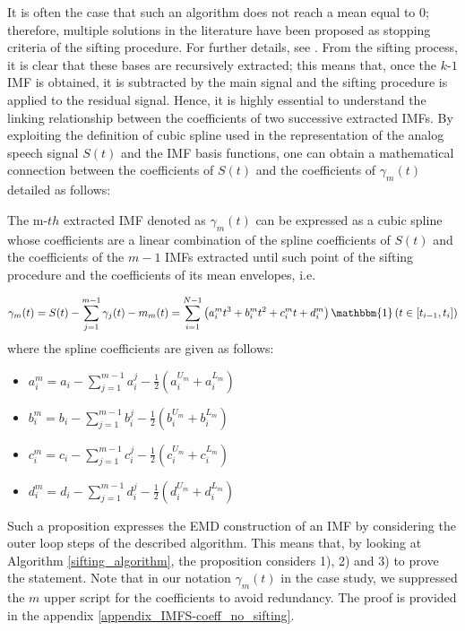 It is often the case that such an algorithm does not reach a mean equal to 0; therefore, multiple solutions in the literature have been proposed as stopping criteria of the sifting procedure. For further details, see \cite{Machine}. From the sifting process, it is clear that these bases are recursively extracted; this means that, once the $k$-$1$ IMF is obtained, it is subtracted by the main signal and the sifting procedure is applied to the residual signal. Hence, it is highly essential to understand the linking relationship between the coefficients of two successive extracted IMFs.
By exploiting the definition of cubic spline used in the representation of the analog speech signal $S(t)$ and the IMF basis functions, one can obtain a mathematical connection between the coefficients of $S(t)$ and the coefficients of $\gamma_m(t)$ detailed as follows:

\begin{Proposition}
\label{prop_cs}
The m-$th$ extracted IMF denoted as $\gamma_m(t)$ can be expressed as a cubic spline whose coefficients are a linear combination of the spline coefficients of $S(t)$ and the coefficients of the $m-1$ IMFs extracted until such point of the sifting procedure and the coefficients of its mean envelopes, i.e.

\begin{equation}
\gamma_m(t) = S(t) - \sum_{j=1}^{m-1} \gamma_j(t) - m_{m}(t) = \sum_{i=1}^{N-1} \left( a_i^m t^3 + b_i^m t^2 + c_i^m t + d_i^m \right) \mathbbm{1} \left( t \in \left[ t_{i-1}, t_i \right] \right)
\end{equation}
where the spline coefficients are given as follows:
\begin{multicols}{2}
\begin{itemize}
\item $a_i^m = a_i - \sum_{j=1}^{m-1} a_i^j - \frac{1}{2} ( a_i^{U_m} + a_i^{L_m}) $
\item $b_i^m = b_i - \sum_{j=1}^{m-1} b_i^j - \frac{1}{2}( b_i^{U_m} + b_i^{L_m}) $
\item $c_i^m = c_i - \sum_{j=1}^{m-1} c_i^j - \frac{1}{2} ( c_i^{U_m} + c_i^{L_m}) $
\item $d_i^m = d_i - \sum_{j=1}^{m-1} d_i^j - \frac{1}{2} ( d_i^{U_m} + d_i^{L_m}) $
\end{itemize}
\end{multicols}
\end{Proposition}

Such a proposition expresses the EMD construction of an IMF by considering the outer loop steps of the described algorithm. This means that, by looking at Algorithm \ref{sifting_algorithm}, the proposition considers 1), 2) and 3) to prove the statement. Note that in our notation $\gamma_m(t)$ in the case study, we suppressed the $m$ upper script for the coefficients to avoid redundancy. The proof is provided in the appendix \ref{appendix_IMFS-coeff_no_sifting}.
